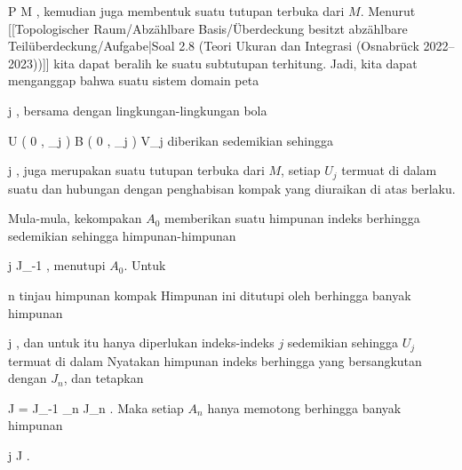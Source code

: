 {{ {}
 {P \in M} {}
 {} {} {} {,}
kemudian juga membentuk suatu tutupan terbuka dari $M$. Menurut
[[Topologischer Raum/Abzählbare Basis/Überdeckung besitzt abzählbare Teilüberdeckung/Aufgabe|Soal 2.8 (Teori Ukuran dan Integrasi (Osnabrück 2022--2023))]]
kita dapat beralih ke suatu subtutupan terhitung. Jadi, kita dapat menganggap bahwa suatu sistem domain peta

 {}
 {j \in \N} {}
 {} {} {} {,}
bersama dengan lingkungan-lingkungan bola

\mavergleichskettedisp
{\vergleichskette
{ U \left(   0 , \delta_j   \right)
}
{ \subset} { B  \left(  0 , \epsilon_j  \right)
}
{ \subset} { V_j
}
{ } {
}
{ } {
}
}
{}{}{}
diberikan sedemikian sehingga

 {}
 {j \in \N} {}
 {} {} {} {,}
juga merupakan suatu tutupan terbuka dari $M$, setiap $U_j$ termuat di dalam suatu
 dan hubungan dengan penghabisan kompak yang diuraikan di atas berlaku.}
{}
{Mula-mula, kekompakan $A_0$ memberikan suatu himpunan indeks berhingga
 sedemikian sehingga himpunan-himpunan

 {}
 {j \in J_{-1}} {}
 {} {} {} {,}
menutupi $A_0$. Untuk

\mavergleichskette
{\vergleichskette
{ n
}
{ \in }{ \N
}
{  }{
}
{    }{
}
{   }{
}
}
{}{}{}
tinjau himpunan kompak
 Himpunan ini ditutupi oleh berhingga banyak himpunan

 {}
 {j \in \N} {}
 {} {} {} {,}
dan untuk itu hanya diperlukan indeks-indeks $j$ sedemikian sehingga $U_j$ termuat di dalam
 Nyatakan himpunan indeks berhingga yang bersangkutan dengan $J_n$, dan tetapkan

\mavergleichskette
{\vergleichskette
{ J
}
{ = }{ J_{-1} \cup \bigcup_{n \in \N} J_n
}
{  }{
}
{    }{
}
{   }{
}
}
{}{}{.}
Maka setiap $A_n$ hanya memotong berhingga banyak himpunan

 {}
 {j \in J} {}
 {} {} {} {.}}
{}

}


